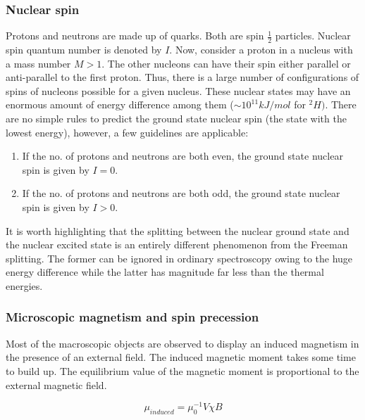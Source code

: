 		\subsubsection{Nuclear spin}

		Protons and neutrons are made up of quarks. Both are spin $\frac{1}{2}$
		particles. Nuclear spin quantum number is denoted by $I$. Now, consider
		a proton in a nucleus with a mass number $M>1.$ The other nucleons
		can have their spin either parallel or anti-parallel to the first
		proton. Thus, there is a large number of configurations of spins of
		nucleons possible for a given nucleus. These nuclear states may have
		an enormous amount of energy difference among them ($\sim10^{11}kJ/mol$
		for $^{2}H)$. There are no simple rules to predict the ground state
		nuclear spin (the state with the lowest energy), however, a few guidelines
		are applicable:
		\begin{enumerate}
		\item If the no. of protons and neutrons are both even, the ground state
		nuclear spin is given by $I=0.$ 
		\item If the no. of protons and neutrons are both odd, the ground state
		nuclear spin is given by $I>0.$
		\end{enumerate}
		It is worth highlighting that the splitting between the nuclear ground
		state and the nuclear excited state is an entirely different phenomenon
		from the Freeman splitting. The former can be ignored in ordinary
		spectroscopy owing to the huge energy difference while the latter
		has magnitude far less than the thermal energies.


		\subsubsection{Microscopic magnetism and spin precession}

		Most of the macroscopic objects are observed to display an induced
		magnetism in the presence of an external field. The induced magnetic
		moment takes some time to build up. The equilibrium value of the magnetic
		moment is proportional to the external magnetic field.

		\begin{equation}
		\mu_{induced}=\mu_{0}^{-1}V\chi B
		\end{equation}


